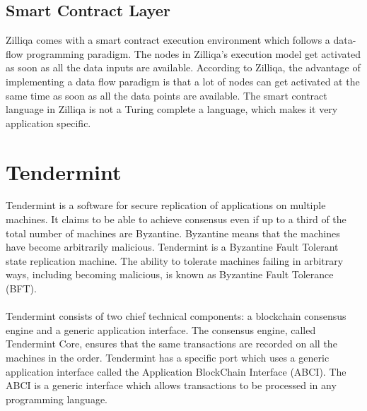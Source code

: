 \documentclass[a4paper,twoside,phd]{BYUPhys}
\begin{document}
\subsection{Smart Contract Layer}
Zilliqa comes with a smart contract execution environment which follows a data-flow programming paradigm. The nodes in Zilliqa's execution model get activated as soon as all the data inputs are available. According to Zilliqa, the advantage of implementing a data flow paradigm is that a lot of nodes can get activated at the same time as soon as all the data points are available. The smart contract language in Zilliqa is not a Turing complete a language, which makes it very application specific. 

\section{Tendermint}
Tendermint is a software for secure replication of applications on multiple machines. It claims to be able to achieve consensus even if up to a third of the total number of machines are Byzantine. Byzantine means that the machines have become arbitrarily malicious. Tendermint is a Byzantine Fault Tolerant state replication machine. The ability to tolerate machines failing in arbitrary ways, including becoming malicious, is known as Byzantine Fault Tolerance (BFT).
\\
\\
Tendermint consists of two chief technical components: a blockchain consensus engine and a generic application interface. The consensus engine, called Tendermint Core, ensures that the same transactions are recorded on all the machines in the order. Tendermint has a specific port which uses a generic application interface called the Application BlockChain Interface (ABCI). The ABCI is a generic interface which allows transactions to be processed in any programming language. 
\end{document}

